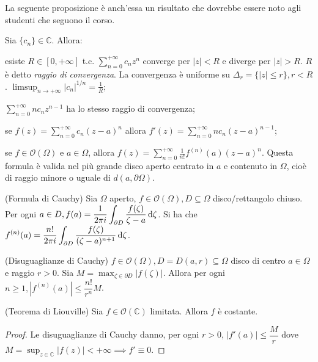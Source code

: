 La seguente proposizione è anch'essa un risultato che dovrebbe essere noto agli studenti che seguono il corso.

\begin{prop}
  Sia $\{c_n\} \in \mathbb{C}$. Allora:
  \begin{nlist}
    \item esiste $R \in [0, +\infty]$ t.c. $\displaystyle \sum_{n=0}^{+\infty} c_nz^n$ converge per $|z|<R$ e diverge per $|z|>R$. $R$ è detto \textit{raggio di convergenza}. La convergenza è uniforme su $\Delta_r=\{|z| \le r\}, r<R$. $\displaystyle \limsup_{n \longrightarrow +\infty} |c_n|^{1/n}=\frac{1}{R}$;
    \item $\displaystyle \sum_{n=0}^{+\infty} nc_nz^{n-1}$ ha lo stesso raggio di convergenza;
    \item se $\displaystyle f(z)=\sum_{n=0}^{+\infty} c_n(z-a)^n$ allora $f'(z)=\sum_{n=0}^{+\infty} nc_n(z-a)^{n-1}$;
    \item se $f \in \mathcal{O}(\Omega)$ e $a \in \Omega$, allora $\displaystyle f(z)=\sum_{n=0}^{+\infty} \frac{1}{n!}f^{(n)}(a)(z-a)^n$. Questa formula è valida nel più grande disco aperto centrato in $a$ e contenuto in $\Omega$, cioè di raggio minore o uguale di $d(a, \partial \Omega)$.
  \end{nlist}
\end{prop}

\begin{thm}
  (Formula di Cauchy) Sia $\Omega$ aperto, $f \in \mathcal{O}(\Omega), D \subseteq \Omega$ disco/rettangolo chiuso. Per ogni $\displaystyle a \in D, f(a)=\frac{1}{2\pi i} \int_{\partial D} \frac{f(\zeta)}{\zeta-a} \mathop{}\!\mathrm{d}\zeta$.
  Si ha che $\displaystyle f^{(n)}(a)=\frac{n!}{2\pi i} \int_{\partial D} \frac{f(\zeta)}{(\zeta-a)^{n+1}}\mathop{}\!\mathrm{d} \zeta$.
\end{thm}

\begin{cor}
  (Disuguaglianze di Cauchy) $f \in \mathcal{O}(\Omega), D=D(a, r) \subseteq \Omega$ disco di centro $a \in \Omega$ e raggio $r>0$. Sia $\displaystyle M=\max_{\zeta \in \partial D} |f(\zeta)|$. Allora per ogni $n \ge 1, |f^{(n)}(a)| \le \dfrac{n!}{r^n}M$.
\end{cor}

\begin{cor} \label{liou}
  (Teorema di Liouville) Sia $f \in \mathcal{O}(\mathbb{C})$ limitata. Allora $f$ è costante.
\end{cor}

\begin{proof}
  Le disuguaglianze di Cauchy danno, per ogni $r>0$, $|f'(a)| \le \dfrac{M}{r}$ dove $\displaystyle M=\sup_{z \in \mathbb{C}} |f(z)|<+\infty \implies
  f' \equiv 0$.
\end{proof}

